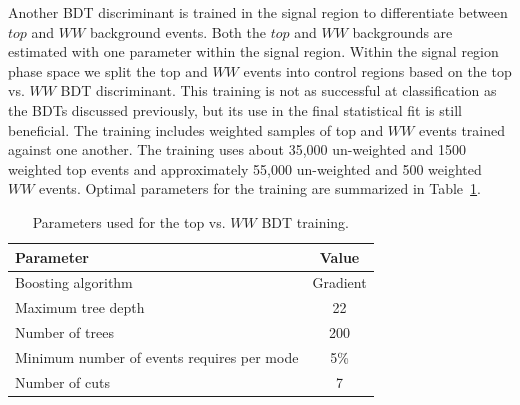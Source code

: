 Another BDT discriminant is trained in the signal region to differentiate between $top$ and $WW$ background events. Both the $top$ and $WW$ backgrounds are estimated with one parameter within the signal region. Within the signal region phase space we split the top and $WW$ events into control regions based on the top vs. $WW$ BDT discriminant. This training is not as successful at classification as the BDTs discussed previously, but its use in the final statistical fit is still beneficial. The training includes weighted samples of top and $WW$ events trained against one another. The training uses about 35,000 un-weighted and 1500 weighted top events and approximately 55,000 un-weighted and 500 weighted $WW$ events. Optimal parameters for the training are summarized in Table~\ref{tab:WWBDTparameters}.
\begin{table}[h!]
\centering
\begin{tabular}{|l|c|}
\hline
Parameter                                    & Value     \\
\hline
Boosting algorithm                           &  Gradient  \\
Maximum tree depth                           &  22       \\
Number of trees                              &  200     \\
Minimum number of events requires per mode   &  5\%      \\
Number of cuts                               &  7        \\
\hline
\end{tabular}
\caption{Parameters used for the top vs. $WW$ BDT training.} 
\label{tab:WWBDTparameters}
\end{table}

